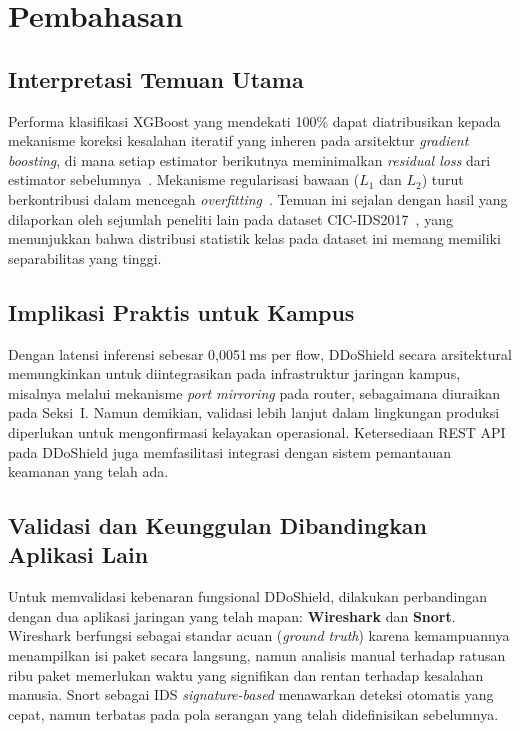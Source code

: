 \documentclass[conference,a4paper]{IEEEtran}
\begin{document}
\section{Pembahasan}
\label{sec:diskusi}

\subsection{Interpretasi Temuan Utama}

Performa klasifikasi XGBoost yang mendekati 100\% dapat diatribusikan kepada mekanisme koreksi kesalahan iteratif yang inheren pada arsitektur \textit{gradient boosting}, di mana setiap estimator berikutnya meminimalkan \textit{residual loss} dari estimator sebelumnya~\cite{ref_xgboost2016}. Mekanisme regularisasi bawaan ($L_1$ dan $L_2$) turut berkontribusi dalam mencegah \textit{overfitting}~\cite{ref_thakkar2020}. Temuan ini sejalan dengan hasil yang dilaporkan oleh sejumlah peneliti lain pada dataset CIC-IDS2017~\cite{ref_engelen2021,ref_leevy2020}, yang menunjukkan bahwa distribusi statistik kelas pada dataset ini memang memiliki separabilitas yang tinggi.

\subsection{Implikasi Praktis untuk Kampus}

Dengan latensi inferensi sebesar 0,0051\,ms per flow, DDoShield secara arsitektural memungkinkan untuk diintegrasikan pada infrastruktur jaringan kampus, misalnya melalui mekanisme \textit{port mirroring} pada router, sebagaimana diuraikan pada Seksi~I. Namun demikian, validasi lebih lanjut dalam lingkungan produksi diperlukan untuk mengonfirmasi kelayakan operasional. Ketersediaan REST API pada DDoShield juga memfasilitasi integrasi dengan sistem pemantauan keamanan yang telah ada.

\subsection{Validasi dan Keunggulan Dibandingkan Aplikasi Lain}

Untuk memvalidasi kebenaran fungsional DDoShield, dilakukan perbandingan dengan dua aplikasi jaringan yang telah mapan: \textbf{Wireshark} dan \textbf{Snort}. Wireshark berfungsi sebagai standar acuan (\textit{ground truth}) karena kemampuannya menampilkan isi paket secara langsung, namun analisis manual terhadap ratusan ribu paket memerlukan waktu yang signifikan dan rentan terhadap kesalahan manusia. Snort sebagai IDS \textit{signature-based} menawarkan deteksi otomatis yang cepat, namun terbatas pada pola serangan yang telah didefinisikan sebelumnya.
\end{document}

